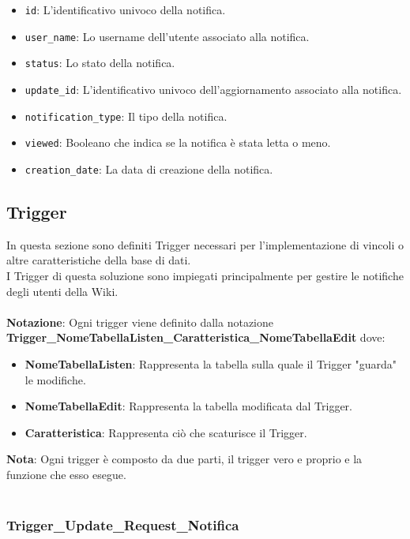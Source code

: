 \documentclass{article}
\begin{document}
    \begin{itemize}
    	\item \texttt{id}: L'identificativo univoco della notifica.
    	\item \texttt{user\_name}: Lo username dell'utente associato alla notifica.
    	\item \texttt{status}: Lo stato della notifica.
    	\item \texttt{update\_id}: L'identificativo univoco dell'aggiornamento associato alla notifica.
    	\item \texttt{notification\_type}: Il tipo della notifica.
    	\item \texttt{viewed}: Booleano che indica se la notifica è stata letta o meno.
    	\item \texttt{creation\_date}: La data di creazione della notifica.
    \end{itemize}
    
    

	\newpage
	
\subsection{Trigger}
	In questa sezione sono definiti Trigger necessari per l'implementazione di vincoli o altre caratteristiche della base di dati.
	\\
	I Trigger di questa soluzione sono impiegati principalmente per gestire le notifiche degli utenti della Wiki.
	\\\\
	\textbf{Notazione}: Ogni trigger viene definito dalla notazione \textbf{Trigger\_NomeTabellaListen\_Caratteristica\_NomeTabellaEdit} dove:
	
	\begin{itemize}
		\item \textbf{NomeTabellaListen}: Rappresenta la tabella sulla quale il Trigger "guarda" le modifiche.
		\item \textbf{NomeTabellaEdit}: Rappresenta la tabella modificata dal Trigger.
		\item \textbf{Caratteristica}: Rappresenta ci\`o che scaturisce il Trigger.
		\\
	\end{itemize}	
\textbf{Nota}: Ogni trigger \`e composto da due parti, il trigger vero e proprio e la funzione che esso esegue.
\\\\

	
	\subsubsection{Trigger\_Update\_Request\_Notifica}
	
\end{document}
